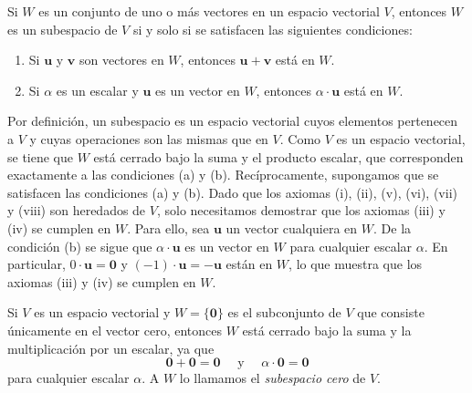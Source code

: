 \begin{theorem}{}{}
    Si $W$ es un conjunto de uno o más vectores en un espacio vectorial $V$, entonces $W$ es un subespacio de $V$ si y solo si se satisfacen las siguientes condiciones:
    \begin{enumerate}[label=\alph*), topsep=6pt, itemsep=0pt]
        \item Si $\mathbf{u}$ y $\mathbf{v}$ son vectores en $W$, entonces $\mathbf{u} + \mathbf{v}$ está en $W$.
        \item Si $\alpha$ es un escalar y $\mathbf{u}$ es un vector en $W$, entonces $\alpha \cdot \mathbf{u}$ está en $W$.
    \end{enumerate}

    \tcblower
    \demostracion Por definición, un subespacio es un espacio vectorial cuyos elementos pertenecen a $V$ y cuyas operaciones son las mismas que en $V$. Como $V$ es un espacio vectorial, se tiene que $W$ está cerrado bajo la suma y el producto escalar, que corresponden exactamente a las condiciones (a) y (b). Recíprocamente, supongamos que se satisfacen las condiciones (a) y (b). Dado que los axiomas (i), (ii), (v), (vi), (vii) y (viii) son heredados de $V$, solo necesitamos demostrar que los axiomas (iii) y (iv) se cumplen en $W$. Para ello, sea $\mathbf{u}$ un vector cualquiera en $W$. De la condición (b) se sigue que $\alpha \cdot \mathbf{u}$ es un vector en $W$ para cualquier escalar $\alpha$. En particular, $0 \cdot \mathbf{u} = \mathbf{0}$ y $(-1) \cdot \mathbf{u} = -\mathbf{u}$ están en $W$, lo que muestra que los axiomas (iii) y (iv) se cumplen en $W$. 
\end{theorem}

\newpage

\begin{examplebox}{}{}
    Si $V$ es un espacio vectorial y $W = \{ \mathbf{0} \}$ es el subconjunto de $V$ que consiste únicamente en el vector cero, entonces $W$ está cerrado bajo la suma y la multiplicación por un escalar, ya que
    $$\mathbf{0} + \mathbf{0} = \mathbf{0} \quad \text{ y } \quad \alpha \cdot \mathbf{0} = \mathbf{0}$$
    para cualquier escalar $\alpha$. A $W$ lo llamamos el \emph{subespacio cero} de $V$.
\end{examplebox}

